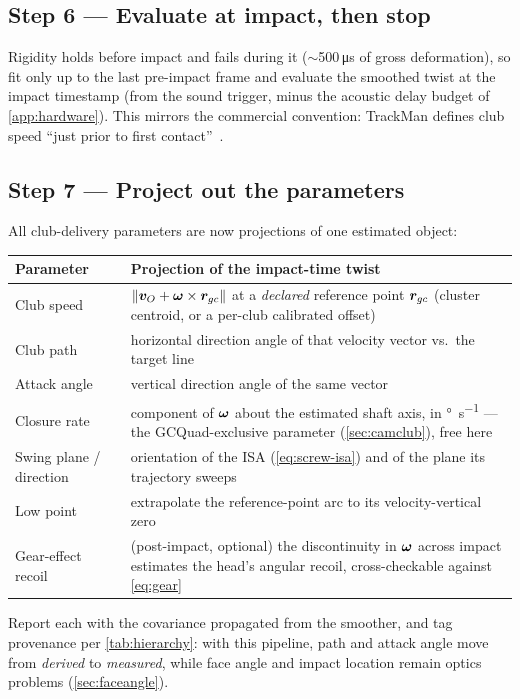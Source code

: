 \subsection*{Step 6 --- Evaluate at impact, then stop}
Rigidity holds before impact and fails during it ($\sim$500\,\si{\micro\second} of gross deformation), so fit only up to the last pre-impact frame and evaluate the smoothed twist at the impact timestamp (from the sound trigger, minus the acoustic delay budget of \cref{app:hardware}).
This mirrors the commercial convention: TrackMan defines club speed ``just prior to first contact''~\cite{trackmanclubspeed}.

\subsection*{Step 7 --- Project out the parameters}
All club-delivery parameters are now projections of one estimated object:
\begin{center}\small
\begin{tabular}{@{}p{3.6cm}p{9.6cm}@{}}
\toprule
\textbf{Parameter} & \textbf{Projection of the impact-time twist} \\
\midrule
Club speed & $\lVert \bm{v}_O + \bm{\omega}\times\bm{r}_{gc} \rVert$ at a \emph{declared} reference point $\bm{r}_{gc}$ (cluster centroid, or a per-club calibrated offset) \\
Club path & horizontal direction angle of that velocity vector vs.\ the target line \\
Attack angle & vertical direction angle of the same vector \\
Closure rate & component of $\bm{\omega}$ about the estimated shaft axis, in \si{\degree\per\second} --- the GCQuad-exclusive parameter (\cref{sec:camclub}), free here \\
Swing plane / direction & orientation of the ISA (\cref{eq:screw-isa}) and of the plane its trajectory sweeps \\
Low point & extrapolate the reference-point arc to its velocity-vertical zero \\
Gear-effect recoil & (post-impact, optional) the discontinuity in $\bm{\omega}$ across impact estimates the head's angular recoil, cross-checkable against \cref{eq:gear} \\
\bottomrule
\end{tabular}
\end{center}
Report each with the covariance propagated from the smoother, and tag provenance per \cref{tab:hierarchy}: with this pipeline, path and attack angle move from \emph{derived} to \emph{measured}, while face angle and impact location remain optics problems (\cref{sec:faceangle}).

